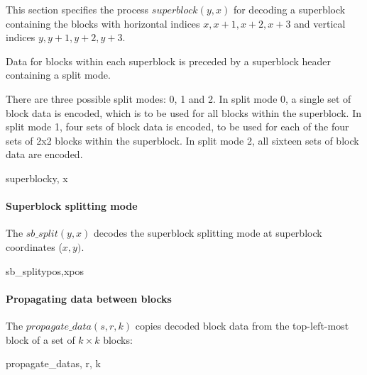 \label{superblockdecoding}

This section specifies the process $superblock(y, x)$ for decoding a superblock containing
the blocks with horizontal indices $x, x+1, x+2, x+3$ and vertical indices $y, y+1, y+2, y+3$.

Data for blocks within each superblock is preceded by a superblock header containing
a split mode.

There are three possible split modes: 0, 1 and 2. In split mode 0, a single set of block data is encoded, 
which is to be used for all blocks within
the superblock. In split mode 1, four sets of block data is encoded, to be used for each of the four
sets of 2x2 blocks within the superblock. In split mode 2, all sixteen sets of block data are encoded.

\begin{pseudo}{superblock}{y, x}
   \bsEND
\bsEND
\end{pseudo}

\paragraph{Superblock splitting mode}
\label{superblocksplit}

The $sb\_split(y, x)$ decodes the superblock splitting mode at superblock coordinates ($x, y)$.

\begin{pseudo}{sb\_split}{ypos,xpos}
\end{pseudo}

\paragraph{Propagating data between blocks}
\label{propagatedata}

The $propagate\_data(s, r, k)$ copies decoded block data from the top-left-most block
of a set of $k\times k$ blocks:

\begin{pseudo}{propagate\_data}{s, r, k}
        \bsCODE{\BlockData[j][i]=\BlockData[s][r]}
    \bsEND
\bsEND
\end{pseudo}

